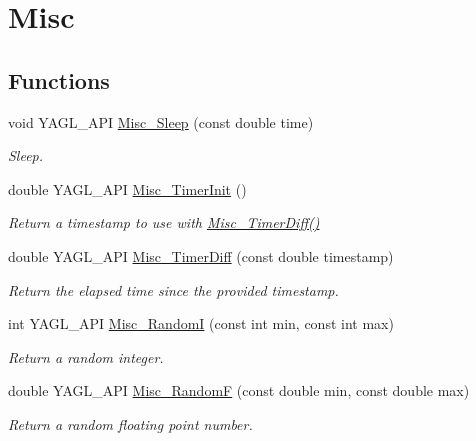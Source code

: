 \hypertarget{group____misc}{\section{Misc}
\label{group____misc}
}
\subsection*{Functions}
\begin{DoxyCompactItemize}
\item 
void Y\-A\-G\-L\-\_\-\-A\-P\-I \hyperlink{group____misc_gad05b0b17f0641c30f5a495655ca2742d}{Misc\-\_\-\-Sleep} (const double time)
\begin{DoxyCompactList}\small\item\em Sleep. \end{DoxyCompactList}\item 
double Y\-A\-G\-L\-\_\-\-A\-P\-I \hyperlink{group____misc_gaf65c406a42bfec38c16ccb36e367d890}{Misc\-\_\-\-Timer\-Init} ()
\begin{DoxyCompactList}\small\item\em Return a timestamp to use with \hyperlink{group____misc_ga1b64de1f11277cc11bfdccea62fae741}{Misc\-\_\-\-Timer\-Diff()} \end{DoxyCompactList}\item 
double Y\-A\-G\-L\-\_\-\-A\-P\-I \hyperlink{group____misc_ga1b64de1f11277cc11bfdccea62fae741}{Misc\-\_\-\-Timer\-Diff} (const double timestamp)
\begin{DoxyCompactList}\small\item\em Return the elapsed time since the provided timestamp. \end{DoxyCompactList}\item 
int Y\-A\-G\-L\-\_\-\-A\-P\-I \hyperlink{group____misc_gac68bd1cac880c6f4f1e16cc3cb1e4936}{Misc\-\_\-\-Random\-I} (const int min, const int max)
\begin{DoxyCompactList}\small\item\em Return a random integer. \end{DoxyCompactList}\item 
double Y\-A\-G\-L\-\_\-\-A\-P\-I \hyperlink{group____misc_ga560bbd5a414f1b77612dfb09e7e99187}{Misc\-\_\-\-Random\-F} (const double min, const double max)
\begin{DoxyCompactList}\small\item\em Return a random floating point number. \end{DoxyCompactList}\item 

\end{DoxyCompactItemize}

